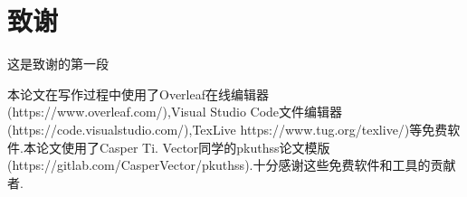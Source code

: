 \chapter{致谢}
这是致谢的第一段
\par
本论文在写作过程中使用了Overleaf在线编辑器(https://www.overleaf.com/),Visual Studio Code文件编辑器(https://code.visualstudio.com/),TexLive https://www.tug.org/texlive/)等免费软件.本论文使用了Casper Ti. Vector同学的pkuthss论文模版(https://gitlab.com/CasperVector/pkuthss).十分感谢这些免费软件和工具的贡献者.

